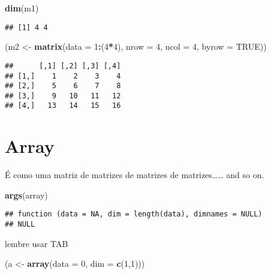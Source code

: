 \documentclass[]{book}
\newenvironment{Shaded}{\begin{snugshade}}{\end{snugshade}}
\newcommand{\KeywordTok}[1]{\textcolor[rgb]{0.13,0.29,0.53}{\textbf{#1}}}
\newcommand{\DataTypeTok}[1]{\textcolor[rgb]{0.13,0.29,0.53}{#1}}
\newcommand{\DecValTok}[1]{\textcolor[rgb]{0.00,0.00,0.81}{#1}}
\newcommand{\StringTok}[1]{\textcolor[rgb]{0.31,0.60,0.02}{#1}}
\newcommand{\OtherTok}[1]{\textcolor[rgb]{0.56,0.35,0.01}{#1}}
\newcommand{\OperatorTok}[1]{\textcolor[rgb]{0.81,0.36,0.00}{\textbf{#1}}}
\newcommand{\NormalTok}[1]{#1}
\theoremstyle{definition}
\theoremstyle{definition}
\theoremstyle{definition}
\theoremstyle{remark}
\begin{document}
\begin{Shaded}
\begin{Highlighting}[]
\KeywordTok{dim}\NormalTok{(m1)}
\end{Highlighting}
\end{Shaded}

\begin{verbatim}
## [1] 4 4
\end{verbatim}

\begin{Shaded}
\begin{Highlighting}[]
\NormalTok{(m2 <-}\StringTok{ }\KeywordTok{matrix}\NormalTok{(}\DataTypeTok{data =} \DecValTok{1}\OperatorTok{:}\NormalTok{(}\DecValTok{4}\OperatorTok{*}\DecValTok{4}\NormalTok{), }\DataTypeTok{nrow =} \DecValTok{4}\NormalTok{, }\DataTypeTok{ncol =} \DecValTok{4}\NormalTok{, }\DataTypeTok{byrow =} \OtherTok{TRUE}\NormalTok{))}
\end{Highlighting}
\end{Shaded}

\begin{verbatim}
##      [,1] [,2] [,3] [,4]
## [1,]    1    2    3    4
## [2,]    5    6    7    8
## [3,]    9   10   11   12
## [4,]   13   14   15   16
\end{verbatim}

\section{Array}\label{array}

É como uma matriz de matrizes de matrizes de matrizes\ldots{}\ldots{}
and so on.

\begin{Shaded}
\begin{Highlighting}[]
\KeywordTok{args}\NormalTok{(array)}
\end{Highlighting}
\end{Shaded}

\begin{verbatim}
## function (data = NA, dim = length(data), dimnames = NULL) 
## NULL
\end{verbatim}

lembre usar TAB

\begin{Shaded}
\begin{Highlighting}[]
\NormalTok{(a <-}\StringTok{ }\KeywordTok{array}\NormalTok{(}\DataTypeTok{data =} \DecValTok{0}\NormalTok{, }\DataTypeTok{dim =} \KeywordTok{c}\NormalTok{(}\DecValTok{1}\NormalTok{,}\DecValTok{1}\NormalTok{)))}
\end{Highlighting}
\end{Shaded}
\end{document}
